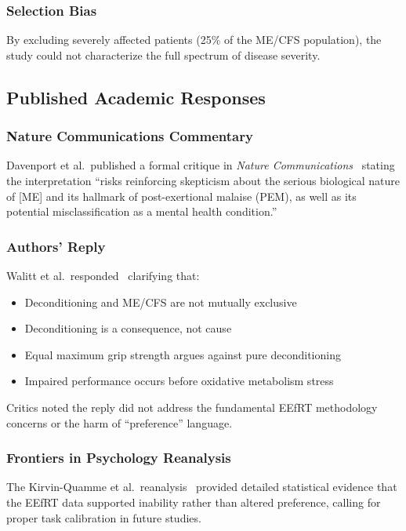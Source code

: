 \subsubsection{Selection Bias}
By excluding severely affected patients (25\% of the ME/CFS population), the study could not characterize the full spectrum of disease severity.

\subsection{Published Academic Responses}

\subsubsection{Nature Communications Commentary}
Davenport et al.\ published a formal critique in \textit{Nature Communications}~\cite{effortcritique2025} stating the interpretation ``risks reinforcing skepticism about the serious biological nature of [ME] and its hallmark of post-exertional malaise (PEM), as well as its potential misclassification as a mental health condition.''

\subsubsection{Authors' Reply}
Walitt et al.\ responded~\cite{walitt2025reply} clarifying that:
\begin{itemize}
    \item Deconditioning and ME/CFS are not mutually exclusive
    \item Deconditioning is a consequence, not cause
    \item Equal maximum grip strength argues against pure deconditioning
    \item Impaired performance occurs before oxidative metabolism stress
\end{itemize}

Critics noted the reply did not address the fundamental EEfRT methodology concerns or the harm of ``preference'' language.

\subsubsection{Frontiers in Psychology Reanalysis}
The Kirvin-Quamme et al.\ reanalysis~\cite{kirvinquamme2025effort} provided detailed statistical evidence that the EEfRT data supported inability rather than altered preference, calling for proper task calibration in future studies.

